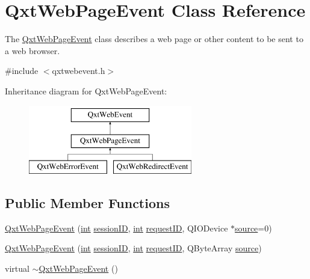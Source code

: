 \hypertarget{class_qxt_web_page_event}{\section{Qxt\-Web\-Page\-Event Class Reference}
\label{class_qxt_web_page_event}
}


The \hyperlink{class_qxt_web_page_event}{Qxt\-Web\-Page\-Event} class describes a web page or other content to be sent to a web browser.  




{\ttfamily \#include $<$qxtwebevent.\-h$>$}

Inheritance diagram for Qxt\-Web\-Page\-Event\-:\begin{figure}[H]
\begin{center}
\leavevmode
\includegraphics[height=3.000000cm]{class_qxt_web_page_event}
\end{center}
\end{figure}
\subsection*{Public Member Functions}
\begin{DoxyCompactItemize}
\item 
\hyperlink{class_qxt_web_page_event_a18eaf31790737fc36cb72b505f1dd2ea}{Qxt\-Web\-Page\-Event} (\hyperlink{ioapi_8h_a787fa3cf048117ba7123753c1e74fcd6}{int} \hyperlink{class_qxt_web_event_a3fdb1d80c46e535c2c79a06269a5d307}{session\-I\-D}, \hyperlink{ioapi_8h_a787fa3cf048117ba7123753c1e74fcd6}{int} \hyperlink{class_qxt_web_page_event_a144c8010cc1c9d239bf5de4c72d09f7a}{request\-I\-D}, Q\-I\-O\-Device $\ast$\hyperlink{glext_8h_afdd0f0e67e302eefcb4f6b23732e7ea3}{source}=0)
\item 
\hyperlink{class_qxt_web_page_event_a744f6913585197536efb395b2dd769c3}{Qxt\-Web\-Page\-Event} (\hyperlink{ioapi_8h_a787fa3cf048117ba7123753c1e74fcd6}{int} \hyperlink{class_qxt_web_event_a3fdb1d80c46e535c2c79a06269a5d307}{session\-I\-D}, \hyperlink{ioapi_8h_a787fa3cf048117ba7123753c1e74fcd6}{int} \hyperlink{class_qxt_web_page_event_a144c8010cc1c9d239bf5de4c72d09f7a}{request\-I\-D}, Q\-Byte\-Array \hyperlink{glext_8h_afdd0f0e67e302eefcb4f6b23732e7ea3}{source})
\item 
virtual \hyperlink{class_qxt_web_page_event_a596bea65a52f50f2e5a2a9e02ebfe15d}{$\sim$\-Qxt\-Web\-Page\-Event} ()
\end{DoxyCompactItemize}
